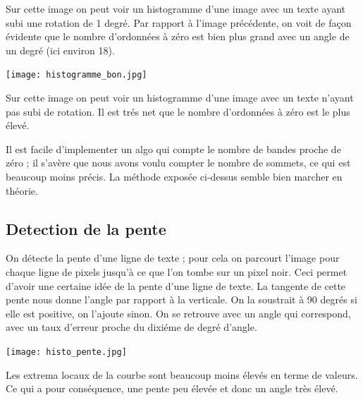 \documentclass[a4paper,12pt]{report}
\begin{document}
Sur cette image on peut voir un histogramme d'une image avec un texte
ayant subi une rotation de 1 degr\'e. Par rapport \`a l'image
pr\'ec\'edente, on voit de fa\c con \'evidente que le nombre d'ordonn\'ees
\`a z\'ero est bien plus grand avec un angle de un degr\'e (ici environ 18).


\begin{center}
	
	\texttt{[image: histogramme\_bon.jpg]}\\
\end{center}

Sur cette image on peut voir un histogramme d'une image avec un texte
n'ayant pas subi de rotation. Il est tr\'es net que le nombre
d'ordonn\'ees \`a z\'ero est le plus \'elev\'e.

Il est facile d'implementer un algo qui compte le nombre de bandes
proche de z\'ero ; il s'av\`ere que nous avons voulu compter le nombre de
sommets, ce qui est beaucoup moins pr\'ecis. La m\'ethode expos\'ee
ci-dessus semble bien marcher en th\'eorie.

\subsection{ Detection de la pente }
On d\'etecte la pente d'une ligne de texte ; pour cela on parcourt
l'image pour chaque ligne de pixels jusqu'\`a ce que l'on tombe sur un
pixel noir. Ceci permet d'avoir une certaine id\'ee de la pente d'une ligne
de texte. La tangente de cette pente nous donne l'angle par rapport \`a
la verticale. On la soustrait \`a 90 degr\'es si elle est positive, on
l'ajoute sinon. On se retrouve avec un angle qui correspond, avec un
taux d'erreur proche du dixi\'eme de degr\'e d'angle.


\begin{center}
	
	\texttt{[image: histo\_pente.jpg]}\\
\end{center}

Les extrema locaux de la courbe sont beaucoup moins \'elev\'es en
terme de valeurs. Ce qui a pour cons\'equence, une pente peu \'elev\'ee et donc un angle tr\`es \'elev\'e.

\end{document}
